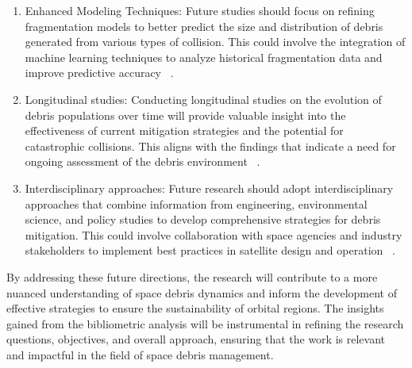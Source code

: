 \documentclass[journal ]{new-aiaa}
\begin{document}
\begin{enumerate}
    \item Enhanced Modeling Techniques: Future studies should focus on refining fragmentation models to better predict the size and distribution of debris generated from various types of collision. This could involve the integration of machine learning techniques to analyze historical fragmentation data and improve predictive accuracy ~\cite{giudici_density-based_2024}.
    \item Longitudinal studies: Conducting longitudinal studies on the evolution of debris populations over time will provide valuable insight into the effectiveness of current mitigation strategies and the potential for catastrophic collisions. This aligns with the findings that indicate a need for ongoing assessment of the debris environment ~\cite{petit_impact_2016}.
    \item Interdisciplinary approaches: Future research should adopt interdisciplinary approaches that combine information from engineering, environmental science, and policy studies to develop comprehensive strategies for debris mitigation. This could involve collaboration with space agencies and industry stakeholders to implement best practices in satellite design and operation ~\cite{olivieri_large_2020}.
\end{enumerate}

By addressing these future directions, the research will contribute to a more nuanced understanding of space debris dynamics and inform the development of effective strategies to ensure the sustainability of orbital regions. The insights gained from the bibliometric analysis will be instrumental in refining the research questions, objectives, and overall approach, ensuring that the work is relevant and impactful in the field of space debris management.


\end{document}
